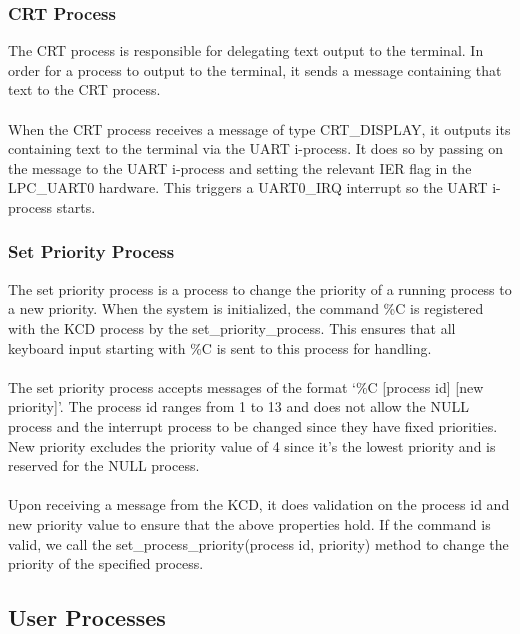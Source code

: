 \documentclass[12pt]{article}
\begin{document}
\subsubsection{CRT Process}
The CRT process is responsible for delegating text output to the terminal. In order for a process to output to the terminal, it sends a message containing that text to the CRT process.\\ \\
When the CRT process receives a message of type CRT\_DISPLAY, it outputs its containing text to the terminal via the UART i-process. It does so by passing on the message to the UART i-process and setting the relevant IER flag in the LPC\_UART0 hardware. This triggers a UART0\_IRQ interrupt so the UART i-process starts.
\subsubsection{Set Priority Process}
The set priority process is a process to change the priority of a running process to a new priority. When the system is initialized, the command \%C is registered with the KCD process by the set\_priority\_process. This ensures that all keyboard input starting with \%C is sent to this process for handling. \\ \\
The set priority process accepts messages of the format ‘\%C [process id] [new priority]’. The process id ranges from 1 to 13 and does not allow the NULL process and the interrupt process to be changed since they have fixed priorities. \\
New priority excludes the priority value of 4 since it's the lowest priority and is reserved for the NULL process.\\ \\
Upon receiving a message from the KCD, it does validation on the process id and new priority value to ensure that the above properties hold. If the command is valid, we call the set\_process\_priority(process id, priority) method to change the priority of the specified process.
\subsection{User Processes}
\end{document}

